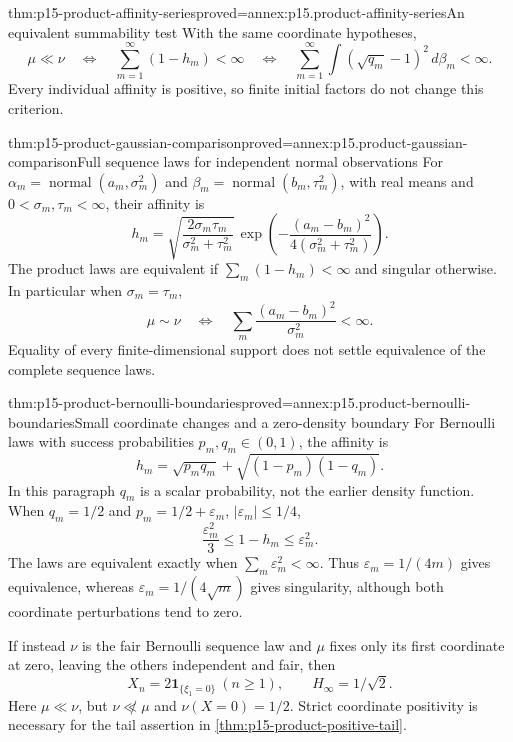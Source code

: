 \begin{hbcorollary}{thm:p15-product-affinity-series}{proved=annex:p15.product-affinity-series}{An equivalent summability test}
With the same coordinate hypotheses,
\[
 \mu\ll\nu
 \quad\Longleftrightarrow\quad
 \sum_{m=1}^\infty(1-h_m)<\infty
 \quad\Longleftrightarrow\quad
 \sum_{m=1}^\infty
   \int(\sqrt{q_m}-1)^2\,d\beta_m<\infty.
\]
Every individual affinity is positive, so finite initial factors do
not change this criterion.
\end{hbcorollary}

\begin{hbtheorem}{thm:p15-product-gaussian-comparison}{proved=annex:p15.product-gaussian-comparison}{Full sequence laws for independent normal observations}
For \(\alpha_m=\operatorname{normal}(a_m,\sigma_m^2)\) and
\(\beta_m=\operatorname{normal}(b_m,\tau_m^2)\), with real means
and \(0<\sigma_m,\tau_m<\infty\), their affinity is
\[
 h_m=\sqrt{\frac{2\sigma_m\tau_m}{\sigma_m^2+\tau_m^2}}\,
 \exp\left(-\frac{(a_m-b_m)^2}{4(\sigma_m^2+\tau_m^2)}\right).
\]
The product laws are equivalent if \(\sum_m(1-h_m)<\infty\)
and singular otherwise. In particular when \(\sigma_m=\tau_m\),
\[
                \mu\sim\nu
       \quad\Longleftrightarrow\quad
           \sum_m\frac{(a_m-b_m)^2}{\sigma_m^2}<\infty.
\]
Equality of every finite-dimensional support does not settle
equivalence of the complete sequence laws.
\end{hbtheorem}

\begin{hbtheorem}{thm:p15-product-bernoulli-boundaries}{proved=annex:p15.product-bernoulli-boundaries}{Small coordinate changes and a zero-density boundary}
For Bernoulli laws with success probabilities \(p_m,q_m\in(0,1)\),
the affinity is
\[
                  h_m=\sqrt{p_mq_m}
                       +\sqrt{(1-p_m)(1-q_m)}.
\]
In this paragraph \(q_m\) is a scalar probability, not the earlier
density function. When \(q_m=1/2\) and
\(p_m=1/2+\varepsilon_m\), \(|\varepsilon_m|\leq1/4\),
\[
             \frac{\varepsilon_m^2}{3}
                  \leq1-h_m\leq\varepsilon_m^2.
\]
The laws are equivalent exactly when \(\sum_m\varepsilon_m^2<\infty\).
Thus \(\varepsilon_m=1/(4m)\) gives equivalence, whereas
\(\varepsilon_m=1/(4\sqrt m)\) gives singularity, although both
coordinate perturbations tend to zero.

If instead \(\nu\) is the fair Bernoulli sequence law and \(\mu\)
fixes only its first coordinate at zero, leaving the others independent
and fair, then
\[
 X_n=2\mathbf1_{\{\xi_1=0\}}\ (n\geq1),\qquad H_\infty=1/\sqrt2.
\]
Here \(\mu\ll\nu\), but \(\nu\not\ll\mu\) and
\(\nu(X=0)=1/2\). Strict coordinate positivity is necessary for
the tail assertion in \cref{thm:p15-product-positive-tail}.
\end{hbtheorem}

